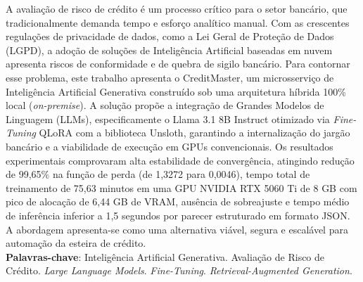 \begin{resumo}
\hspace{1.5cm}
A avaliação de risco de crédito é um processo crítico para o setor bancário, que tradicionalmente demanda tempo e esforço analítico manual. Com as crescentes regulações de privacidade de dados, como a Lei Geral de Proteção de Dados (LGPD), a adoção de soluções de Inteligência Artificial baseadas em nuvem apresenta riscos de conformidade e de quebra de sigilo bancário. Para contornar esse problema, este trabalho apresenta o CreditMaster, um microsserviço de Inteligência Artificial Generativa construído sob uma arquitetura híbrida 100\% local (\textit{on-premise}). A solução propõe a integração de Grandes Modelos de Linguagem (LLMs), especificamente o Llama 3.1 8B Instruct otimizado via \textit{Fine-Tuning} QLoRA com a biblioteca Unsloth, garantindo a internalização do jargão bancário e a viabilidade de execução em GPUs convencionais.  Os resultados experimentais comprovaram alta estabilidade de convergência, atingindo redução de 99,65\% na função de perda (de 1,3272 para 0,0046), tempo total de treinamento de 75,63 minutos em uma GPU NVIDIA RTX 5060 Ti de 8 GB com pico de alocação de 6,44 GB de VRAM, ausência de sobreajuste e tempo médio de inferência inferior a 1,5 segundos por parecer estruturado em formato JSON. A abordagem apresenta-se como uma alternativa viável, segura e escalável para automação da esteira de crédito.
\vspace{\onelineskip}
\noindent\\
\textbf{Palavras-chave}: Inteligência Artificial Generativa. Avaliação de Risco de Crédito. \textit{Large Language Models}. \textit{Fine-Tuning}. \textit{Retrieval-Augmented Generation}.
\end{resumo}

\newpage

